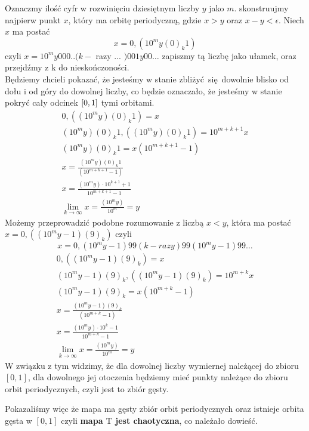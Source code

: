\documentclass[12pt,a4paper]{article}
\renewcommand{\emph}{\textbf}
\begin{document}
Oznaczmy ilość cyfr w rozwinięciu dziesiętnym liczby $y$ jako $m$. skonstruujmy najpierw punkt $x$, który ma orbitę periodyczną, gdzie $x>y$ oraz $x-y<\epsilon$. Niech $x$ ma postać 
$$x=0,\left(10^{m} y(0)_{k} 1\right)$$
czyli $x=10^{m} y 000 . .(k-$ razy ... $) 001 y 00 \ldots$ zapiszmy tą liczbę jako ułamek, oraz przejdźmy z $\mathrm{k}$ do nieskończoności.\\
Będziemy chcieli pokazać, że jesteśmy w stanie zbliżyć się dowolnie blisko od dołu i od góry do dowolnej liczby, co będzie oznaczało, że jesteśmy w stanie pokryć cały odcinek $\qty[0,1]$ tymi orbitami.
$$
\begin{gathered}
0,\left(\left(10^{m} y\right)(0)_{k} 1\right)=x \\
\left(10^{m} y\right)(0)_{k} 1,\left(\left(10^{m} y\right)(0)_{k} 1\right)=10^{m+k+1} x \\
\left(10^{m} y\right)(0)_{k} 1=x\left(10^{m+k+1}-1\right) \\
x=\frac{\left(10^{m} y\right)(0)_{k} 1}{\left(10^{m+k+1}-1\right)} \\
x=\frac{\left(10^{m} y\right) \cdot 10^{k+1}+1}{10^{m+k+1}-1} \\
\lim _{k \rightarrow \infty} x=\frac{\left(10^{m} y\right)}{10^{m}}=y
\end{gathered}
$$
Możemy przeprowadzić podobne rozumowanie z liczbą $x<y$, która ma postać $x=0,\left(\left(10^{m} y-1\right)(9)_{k}\right)$ czyli
$$
x=0,\left(10^{m} y-1\right) 99(k-r a z y) 99\left(10^{m} y-1\right) 99 \ldots
$$
$$
\begin{gathered}
0,\left(\left(10^{m} y-1\right)(9)_{k}\right)=x \\
\left(10^{m} y-1\right)(9)_{k},\left(\left(10^{m} y-1\right)(9)_{k}\right)=10^{m+k} x \\
\left(10^{m} y-1\right)(9)_{k}=x\left(10^{m+k}-1\right) \\
x=\frac{\left(10^{m} y-1\right)(9)_{k}}{\left(10^{m+k}-1\right)} \\
x=\frac{\left(10^{m} y\right) \cdot 10^{k}-1}{10^{m+k}-1} \\
\lim _{k \rightarrow \infty} x=\frac{\left(10^{m} y\right)}{10^{m}}=y
\end{gathered}
$$
W związku z tym widzimy, że dla dowolnej liczby wymiernej należącej do zbioru $[0,1]$, dla dowolnego jej otoczenia będziemy mieć punkty należące do zbioru orbit periodycznych, czyli jest to zbiór gęsty. 

Pokazaliśmy więc że mapa ma gęsty zbiór orbit periodycznych oraz istnieje orbita gęsta w $[0,1]$ czyli \emph{mapa $\mathrm{T}$ jest chaotyczna}, co należało dowieść.
\end{document}
